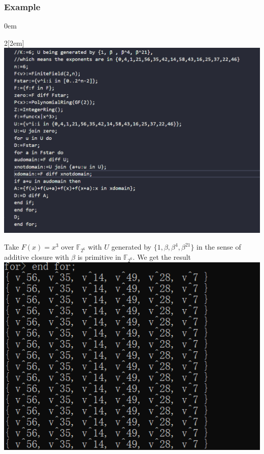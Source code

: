 \documentclass[
    aspectratio=169,                   %
]{beamer}
\newcommand{\F}{\mathbb{F}}
\begin{document}
    \begin{frame}
        \frametitle{Example}
        \parindent0em
        \begin{multicols}{2}[\columnsep2em] 
            \includegraphics[width=\linewidth]{code_image.png}
            \columnbreak

            {Take $ F(x)=x^3 $ over $ \F_{2^6} $ with $ U $ generated by $ \{1,\beta,\beta^4,\beta^{21}\} $ in the sense of additive closure with $ \beta $ is primitive in $ \F_{2^6} $. We get the result}
            \includegraphics[width=0.8\linewidth]{code_result.png}
        \end{multicols}

    
    \end{frame}
\end{document}
